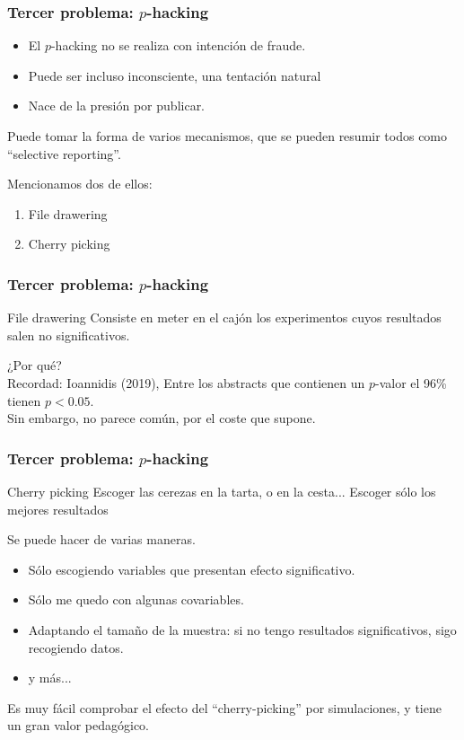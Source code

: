 \documentclass[9pt]{beamer}
\begin{document}
\begin{frame}
  \frametitle{Tercer problema: $p$-hacking}

  \begin{itemize}
  \item<2-> El $p$-hacking no se realiza con intención de fraude. 
  \item<3-> Puede ser incluso inconsciente, una tentación natural
  \item<4-> Nace de la presión por publicar. 
  \end{itemize}
  \begin{block}{}
    Puede tomar la forma de varios mecanismos, que se pueden resumir todos
  como ``selective reporting''.
\end{block}
Mencionamos dos de ellos:
\begin{enumerate}
\item File drawering
\item Cherry picking 
\end{enumerate}
\end{frame}
\begin{frame}
  \frametitle{Tercer problema: $p$-hacking}
  \begin{block}{File drawering}
    Consiste en meter en el cajón los experimentos cuyos resultados
    salen no significativos.
  \end{block}
  ¿Por qué? \\  Recordad: Ioannidis (2019), Entre los
  abstracts que contienen un $p$-valor el 96\% tienen
  $p<0.05$.\\
   Sin embargo, no parece común, por el coste que supone.
  
\end{frame}
\begin{frame}
  \frametitle{Tercer problema: $p$-hacking}
  \begin{block}{Cherry picking}
    Escoger las cerezas en la tarta, o en la cesta... Escoger sólo los
    mejores resultados
  \end{block}
  Se puede hacer de varias maneras.
  \begin{itemize}
  \item<3-> Sólo escogiendo variables que presentan efecto significativo.
  \item<4-> Sólo me quedo con algunas covariables.
  \item<5-> Adaptando el tamaño de la muestra: si no tengo resultados
    significativos, sigo recogiendo datos.
  \item<6-> y más...
  \end{itemize}
  \begin{block}{}
    Es muy fácil comprobar el efecto del ``cherry-picking'' por
    simulaciones, y tiene un gran valor pedagógico.
  \end{block}
\end{frame}
\end{document}
